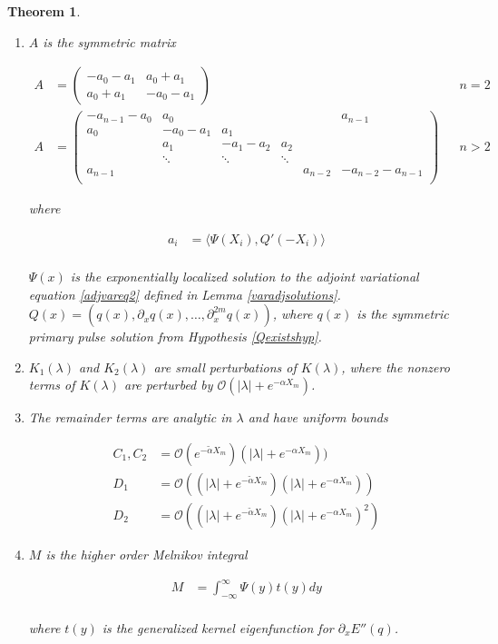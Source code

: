 \documentclass[12pt]{article}
\newtheorem{theorem}{Theorem}
\begin{document}
\begin{theorem}
\begin{enumerate}
where $\nu(\lambda)$ is the small eigenvalue of the asymptotic matrix $A(0; \lambda)$ defined in \eqref{nulambda}.

\item $A$ is the symmetric matrix

\begin{align}\label{Asymm}
A &= \begin{pmatrix}
-a_0 -a_1 & a_0 + a_1 \\
a_0 + a_1 & -a_0 - a_1
\end{pmatrix} && n = 2 \\
A &= \begin{pmatrix}
-a_{n-1} - a_0 & a_0 & & &  & a_{n-1}\\
a_0 & -a_0 - a_1 &  a_1 \\
& a_1 & -a_1 - a_2 &  a_2 \\
& \ddots & \ddots & \ddots \\
a_{n-1} & & & & a_{n-2} & -a_{n-2} - a_{n-1} \\
\end{pmatrix} && n > 2 \nonumber
\end{align}

where

\begin{align*}
a_i &= \langle \Psi(X_i), Q'(-X_i) \rangle \\
\end{align*}

$\Psi(x)$ is the exponentially localized solution to the adjoint variational equation \eqref{adjvareq2} defined in Lemma \ref{varadjsolutions}. $Q(x) = (q(x), \partial_x q(x), \dots, \partial_x^{2m}q(x))$, where $q(x)$ is the symmetric primary pulse solution from Hypothesis \ref{Qexistshyp}.\\

\item $K_1(\lambda)$ and $K_2(\lambda)$ are small perturbations of $K(\lambda)$, where the nonzero terms of $K(\lambda)$ are perturbed by $\mathcal{O}(|\lambda| + e^{-\alpha X_m})$.

\item The remainder terms are analytic in $\lambda$ and have uniform bounds

\begin{align*}
C_1, C_2 &= \mathcal{O}(e^{-\tilde{\alpha}X_m})(|\lambda| + e^{-\alpha X_m})) \\
D_1 &= \mathcal{O}((|\lambda| + e^{-\tilde{\alpha} X_m})(|\lambda| + e^{-\alpha X_m})) \\
D_2 &= \mathcal{O}((|\lambda| + e^{-\tilde{\alpha} X_m})(|\lambda| + e^{-\alpha X_m})^2)
\end{align*}

\item $M$ is the higher order Melnikov integral

\begin{align*}
M &= \int_{-\infty}^\infty \Psi(y) t(y) dy \\
\end{align*}

where $t(y)$ is the generalized kernel eigenfunction for $\partial_x E''(q)$.
\end{enumerate}
\end{theorem}
\end{document}

